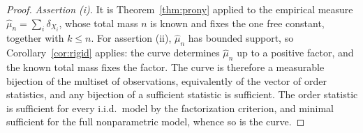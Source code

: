 \documentclass[10pt,a4paper]{amsart}
\begin{document}
		\begin{proof}
			\emph{Assertion (i).} It is Theorem~\ref{thm:prony} applied to the
			empirical measure $\widehat\mu_n=\sum_i\delta_{X_i}$, whose total
			mass $n$ is known and fixes the one free constant, together with
			$k\le n$. For assertion (ii),
			$\widehat\mu_n$ has bounded support, so Corollary~\ref{cor:rigid}
			applies: the curve determines $\widehat\mu_n$ up to a positive
			factor, and the known total mass fixes the factor. The curve is
			therefore a measurable bijection of the multiset of observations,
			equivalently of the vector of order statistics, and any bijection
			of a sufficient statistic is sufficient. The order statistic is
			sufficient for every i.i.d.\ model by the factorization criterion,
			and minimal sufficient for the full nonparametric model, whence so
			is the curve.
		\end{proof}
\end{document}
